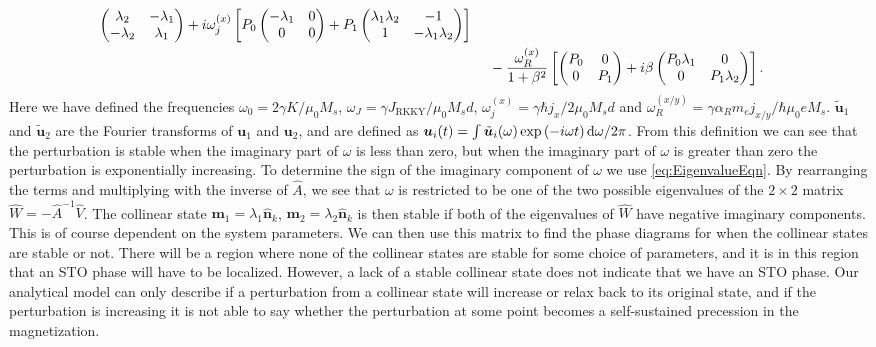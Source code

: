 \begin{subequations}
\begin{align}
\begin{pmatrix}
     \lambda_2 & -\lambda_1 \\
     -\lambda_2 & \lambda_1
    \end{pmatrix}
    + i\omega_j^{(x)}\left[P_0
    \begin{pmatrix}
     -\lambda_1 & 0 \\
     0 & 0
    \end{pmatrix}
    + P_1
    \begin{pmatrix}
     \lambda_1\lambda_2 & -1 \\
     1 & -\lambda_1\lambda_2
    \end{pmatrix}\right] \\
    &\hspace{4.5mm} -\frac{\omega_R^{(x)}}{1+\beta^2}\left[
    \begin{pmatrix}
     P_0 & 0 \\
     0 & P_1
    \end{pmatrix}
    + i \beta
    \begin{pmatrix}
     P_0\lambda_1 & 0 \\
     0 & P_1\lambda_2
    \end{pmatrix}\right]. \label{eq:Vfilm}
\end{align}
\end{subequations}
Here we have defined the frequencies $\omega_0 = 2\gamma K/\mu_0M_s$, $\omega_J = \gamma J_{\text{RKKY}}/\mu_0 M_s d$, $\omega_j^{(x)} = \gamma \hbar j_x/2\mu_0M_sd$ and $\omega_R^{(x/y)} = \gamma \alpha_R m_e j_{x/y}/\hbar\mu_0 e M_s$. $\tilde{\mathbold{u}}_1$ and $\tilde{\mathbold{u}}_2$ are the Fourier transforms of $\mathbold{u}_1$ and $\mathbold{u}_2$, and are defined as $\mathbold{u}_i(t) = \int \tilde{\mathbold{u}}_i(\omega) \exp\left(-i\omega t\right) \d \omega/{2\pi}$. From this definition we can see that the perturbation is stable when the imaginary part of $\omega$ is less than zero, but when the imaginary part of $\omega$ is greater than zero the perturbation is exponentially increasing. To determine the sign of the imaginary component of $\omega$ we use \eqref{eq:EigenvalueEqn}. By rearranging the terms and multiplying with the inverse of $\hat{A}$, we see that $\omega$ is restricted to be one of the two possible eigenvalues of the $2\times2$ matrix $\hat{W} = -\hat{A}^{-1}\hat{V}$. The collinear state $\mathbold{m}_1=\lambda_1\mathbold{\hat{n}}_k$, $\mathbold{m}_2=\lambda_2\mathbold{\hat{n}}_k$ is then stable if both of the eigenvalues of $\hat{W}$ have negative imaginary components. This is of course dependent on the system parameters. We can then use this matrix to find the phase diagrams for when the collinear states are stable or not. There will be a region where none of the collinear states are stable for some choice of parameters, and it is in this region that an STO phase will have to be localized. However, a lack of a stable collinear state does not indicate that we have an STO phase. Our analytical model can only describe if a perturbation from a collinear state will increase or relax back to its original state, and if the perturbation is increasing it is not able to say whether the perturbation at some point becomes a self-sustained precession in the magnetization. 

